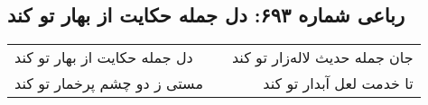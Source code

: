 \begin{center}
\section*{رباعی شماره ۶۹۳: دل جمله حکایت از بهار تو کند}
\label{sec:0693}
\begin{longtable}{l p{0.5cm} r}
دل جمله حکایت از بهار تو کند
&&
جان جمله حدیث لاله‌زار تو کند
\\
مستی ز دو چشم پرخمار تو کند
&&
تا خدمت لعل آبدار تو کند
\\
\end{longtable}
\end{center}
